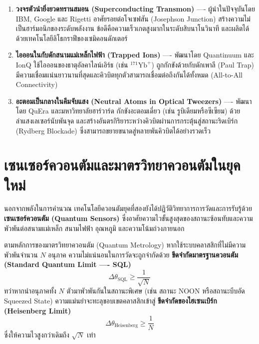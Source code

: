 \begin{enumerate}
    \item \textbf{วงจรตัวนำยิ่งยวดทรานสมอน (Superconducting Transmon)} ---- ผู้นำในปัจจุบันโดย IBM, Google และ Rigetti อาศัยรอยต่อโจเซฟสัน (Josephson Junction) สร้างความไม่เป็นฮาร์มอนิกของระดับพลังงาน ข้อดีคือความเร็วเกตสูงมากในระดับสิบนาโนวินาที และผลิตได้ด้วยเทคโนโลยีลิโธกราฟีของเซมิคอนดักเตอร์
    \item \textbf{ไอออนในกับดักสนามแม่เหล็กไฟฟ้า (Trapped Ions)} ---- พัฒนาโดย Quantinuum และ IonQ ใช้ไอออนของธาตุอัลคาไลน์เอิร์ธ (เช่น $^{171}\text{Yb}^+$) ถูกกักขังด้วยกับดักเพาลี (Paul Trap) มีความเชื่อมแน่นยาวนานที่สุดและคิวบิตทุกตัวสามารถเชื่อมต่อถึงกันได้ทั้งหมด (All-to-All Connectivity)
    \item \textbf{อะตอมเป็นกลางในคีมจับแสง (Neutral Atoms in Optical Tweezers)} ---- พัฒนาโดย QuEra และมหาวิทยาลัยฮาร์วาร์ด กักขังอะตอมเดี่ยว (เช่น รูบิเดียมหรือซีเซียม) ด้วยลำแสงเลเซอร์นับพันจุด และสร้างอันตรกิริยาระหว่างคิวบิตผ่านการกระตุ้นสู่สถานะริดเบิร์ก (Rydberg Blockade) ซึ่งสามารถขยายขนาดสู่หลายพันคิวบิตได้อย่างรวดเร็ว
\end{enumerate}

\section{เซนเซอร์ควอนตัมและมาตรวิทยาควอนตัมในยุคใหม่}

นอกจากพลังในการคำนวณ เทคโนโลยีควอนตัมยุคที่สองยังได้ปฏิวัติวิทยาการการวัดและการรับรู้ด้วย \textbf{เซนเซอร์ควอนตัม (Quantum Sensors)} ซึ่งอาศัยความไวขั้นสูงสุดของสถานะซ้อนทับและความพัวพันต่อสนามแม่เหล็ก สนามไฟฟ้า อุณหภูมิ และความโน้มถ่วงภายนอก

ตามหลักการของมาตรวิทยาควอนตัม (Quantum Metrology) หากใช้ระบบคลาสสิกที่ไม่มีความพัวพันจำนวน $N$ อนุภาค ความไม่แน่นอนในการวัดจะถูกจำกัดด้วย \textbf{ขีดจำกัดมาตรฐานควอนตัม (Standard Quantum Limit ---- SQL)}
\begin{equation}
\Delta \theta_{\text{SQL}} \ge \frac{1}{\sqrt{N}}
\label{eq:sql_limit}
\end{equation}
ทว่าหากนำอนุภาคทั้ง $N$ ตัวมาพัวพันกันในสถานะพิเศษ (เช่น สถานะ NOON หรือสถานะบีบอัด Squeezed State) ความแม่นยำจะทะลุขอบเขตคลาสสิกเข้าสู่ \textbf{ขีดจำกัดของไฮเซนเบิร์ก (Heisenberg Limit)}
\begin{equation}
\Delta \theta_{\text{Heisenberg}} \ge \frac{1}{N}
\label{eq:heisenberg_limit}
\end{equation}
ซึ่งให้ความไวสูงกว่าเดิมถึง $\sqrt{N}$ เท่า

